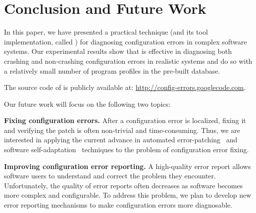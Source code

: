 \section{Conclusion and Future Work}

In this paper, we have presented a practical technique (and
its tool implementation, called \ourtool) for diagnosing
configuration errors in complex software systems.
Our experimental results show that \ourtool is effective in
diagnosing both crashing and non-crashing configuration errors
in realistic systems and do so with a
relatively small number of program profiles in the pre-built database.

The source code of \ourtool is publicly available at:
\url{http://config-errors.googlecode.com}.

\vspace{1mm}

Our future
work will focus on the following two topics:

\textbf{Fixing configuration errors.} After a configuration error
is localized, fixing it and verifying the patch is
often non-trivial and time-consuming. Thus, we
are interested in applying the current advance in
automated error-patching~\cite{PerkinsKLABCPSSSWZEP2009, rangefix} and
software self-adaptation~\cite{Wang:2009:STR, Mori:2011:LSU} techniques to
the problem of configuration error fixing.


\textbf{Improving configuration error reporting.} A high-quality
error report allows software users to understand and correct the problem
they encounter. 
Unfortunately, the quality of error reports often
decreases as software becomes more complex and configurable.
To address this problem, we plan to develop new error reporting mechanisms
to make configuration errors
more diagnosable.









